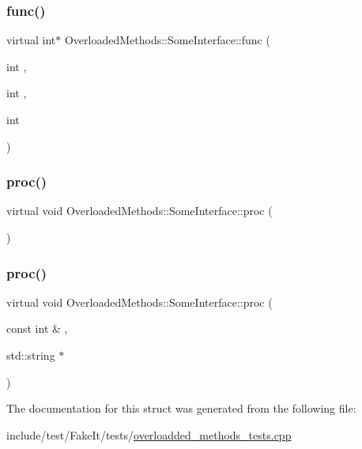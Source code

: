 \mbox{\label{structOverloadedMethods_1_1SomeInterface_a6bcb4e5f6e8d2d5d01d3452e9f5a1e7e}} 
\subsubsection{\texorpdfstring{func()}{func()}\hspace{0.1cm}{\footnotesize\ttfamily [7/7]}}
{\footnotesize\ttfamily virtual int$\ast$ Overloaded\+Methods\+::\+Some\+Interface\+::func (\begin{DoxyParamCaption}\item[{int}]{,  }\item[{int}]{,  }\item[{int}]{ }\end{DoxyParamCaption})\hspace{0.3cm}{\ttfamily [pure virtual]}}

\mbox{\label{structOverloadedMethods_1_1SomeInterface_a0098b35a5303d3aadb94829cc7a2d805}} 
\subsubsection{\texorpdfstring{proc()}{proc()}\hspace{0.1cm}{\footnotesize\ttfamily [1/2]}}
{\footnotesize\ttfamily virtual void Overloaded\+Methods\+::\+Some\+Interface\+::proc (\begin{DoxyParamCaption}{ }\end{DoxyParamCaption})\hspace{0.3cm}{\ttfamily [pure virtual]}}

\mbox{\label{structOverloadedMethods_1_1SomeInterface_a99f08cd10122063aaa09d671ad937f7c}} 
\subsubsection{\texorpdfstring{proc()}{proc()}\hspace{0.1cm}{\footnotesize\ttfamily [2/2]}}
{\footnotesize\ttfamily virtual void Overloaded\+Methods\+::\+Some\+Interface\+::proc (\begin{DoxyParamCaption}\item[{const int \&}]{,  }\item[{std\+::string $\ast$}]{ }\end{DoxyParamCaption})\hspace{0.3cm}{\ttfamily [pure virtual]}}



The documentation for this struct was generated from the following file\+:\begin{DoxyCompactItemize}
\item 
include/test/\+Fake\+It/tests/\mbox{\hyperlink{overloadded__methods__tests_8cpp}{overloadded\+\_\+methods\+\_\+tests.\+cpp}}\end{DoxyCompactItemize}
